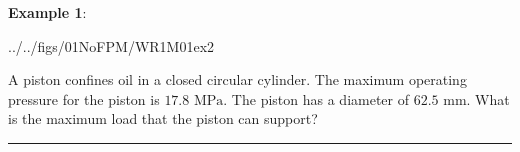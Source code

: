 \documentclass[10pt]{amsart}
\begin{document}
\begin{minipage}[t]{0.45\textwidth}
	\raggedright
	\textbf{Example 1}:
	\begin{cfig}[0.5]{../../figs/01NoFPM/WR1M01ex2}\end{cfig}
	A piston confines oil in a closed circular cylinder. The maximum operating pressure for the
	piston is $17.8\text{ MPa}$. The piston has a diameter of $62.5\text{ mm}$. What is the maximum
	load that the piston can support?
\end{minipage}
\par\vspace{6cm}
\rule{\textwidth}{0.02in}
\parb
\end{document}

